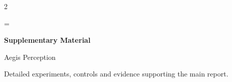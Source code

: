 \documentclass[10pt,a4paper]{article}
\begin{document}




\twocolumn[]





\clearpage\onecolumn



\clearpage\onecolumn

\clearpage\twocolumn
\renewcommand{\dbltopfraction}{.85}
\renewcommand{\topfraction}{.85}


\clearpage\onecolumn
{}
\begingroup\small
\begin{multicols}{2}


\end{multicols}
\endgroup
\onecolumn
\vsize=\textheight
\appendix
\setcounter{page}{1}\renewcommand{\thepage}{S\arabic{page}}
\setcounter{figure}{0}\renewcommand{\thefigure}{S\arabic{figure}}
\renewcommand{\theHfigure}{supp.\arabic{figure}}
\setcounter{table}{0}\renewcommand{\thetable}{S\arabic{table}}
\renewcommand{\theHtable}{supp.\arabic{table}}
\setcounter{equation}{0}\renewcommand{\theequation}{S\arabic{equation}}
\label{sec:supplement}
\begin{center}
{\LARGE\bfseries Supplementary Material\par}
\vspace{3pt}
{\large Aegis Perception\par}
\vspace{2pt}
{\small Detailed experiments, controls and evidence supporting the main report.\par}
\end{center}

\end{document}

